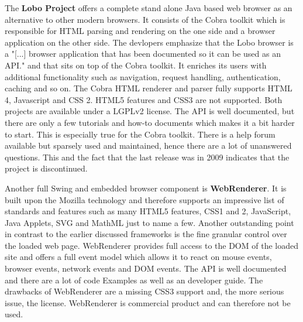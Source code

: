 
The \textbf{Lobo Project} offers a complete stand alone Java based web browser as an alternative to other modern browsers.
It consists of the Cobra toolkit which is responsible for HTML parsing and rendering on the one side and a browser application on the other side.
The devlopers emphasize that the Lobo browser is a "[...]  browser application that has been documented so it can be used as an API." \autocite{tech-ana:lobo} and that sits on top of the Cobra toolkit.
It enriches its users with additional functionality such as navigation, request handling, authentication, caching and so on.
The Cobra HTML renderer and parser fully supports HTML 4, Javascript and CSS 2.
HTML5 features and CSS3 are not supported.
Both projects are available under a LGPLv2 license.
The API is well documented, but there are only a few tutorials and how-to documents which makes it a bit harder to start.
This is especially true for the Cobra toolkit.
There is a help forum available but sparsely used and maintained, hence there are a lot of unanswered questions.
This and the fact that the last release was in 2009 indicates that the project is discontinued.



Another full Swing and embedded browser component is \textbf{WebRenderer}.
It is built upon the Mozilla technology and therefore supports an impressive list of standards and features such as many HTML5 features, CSS1 and 2, JavaScript, Java Applets, SVG and MathML just to name a few.
Another outstanding point in contrast to the earlier discussed frameworks is the fine granular control over the loaded web page.
WebRenderer provides full access to the DOM of the loaded site and offers a full event model which allows it to react on mouse events, browser events, network events and DOM events.
The API is well documented and there are a lot of code Examples as well as an developer guide.
The drawbacks of WebRenderer are a missing CSS3 support and, the more serious issue, the license.
WebRenderer is commercial product and can therefore not be used.



